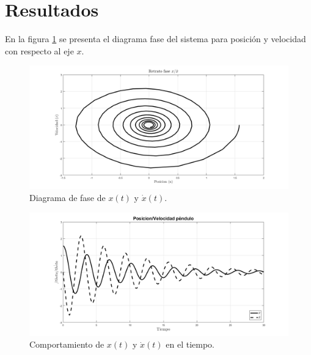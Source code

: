 \section{Resultados}
En la figura \ref{fig: phase plot x} 
se presenta el diagrama fase del sistema para
posición y velocidad con respecto al eje $x$.

\begin{figure}[hb]
 \centering 
 \includegraphics[scale=0.35]{./img/fasependulox2.png}
\caption{Diagrama de fase de $x(t)$ y $\dot{x}(t)$.}
 \label{fig: phase plot x}
\end{figure}



\begin{figure}[hb]
 \centering 
 \includegraphics[scale=0.35]{./img/posvelpendulo2.png}
 \caption{Comportamiento de $x(t)$ y $\dot{x}(t)$ en el tiempo.}
 \label{fig: time plot x dx}
\end{figure}


